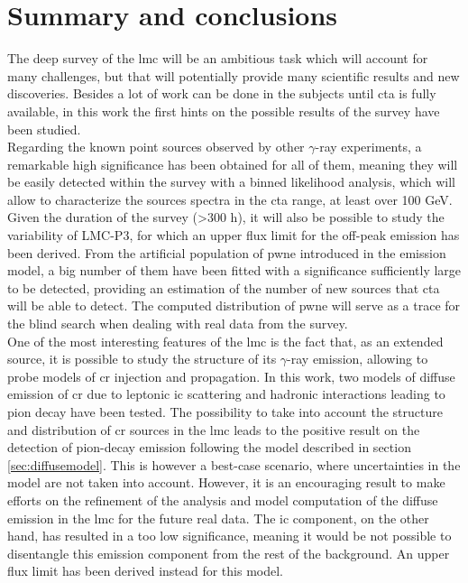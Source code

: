\documentclass[main.tex]{subfiles}
\begin{document}
\section{Summary and conclusions}

The deep survey of the \gls{lmc} will be an ambitious task which will account for many challenges, but that will potentially provide many scientific results and new discoveries. Besides a lot of work can be done in the subjects until \gls{cta} is fully available, in this work the first hints on the possible results of the survey have been studied.\\
Regarding the known point sources observed by other $\gamma$-ray experiments, a remarkable high significance has been obtained for all of them, meaning they will be easily detected within the survey with a binned likelihood analysis, which will allow to characterize the sources spectra in the \gls{cta} range, at least over 100 GeV. Given the duration of the survey (>300 h), it will also be possible to study the variability of LMC-P3, for which an upper flux limit for the off-peak emission has been derived. From the artificial population of \gls{pwne} introduced in the emission model, a big number of them have been fitted with a significance sufficiently large to be detected, providing an estimation of the number of new sources that \gls{cta} will be able to detect. The computed distribution of \gls{pwne} will serve as a trace for the blind search when dealing with real data from the survey.\\
One of the most interesting features of the \gls{lmc} is the fact that, as an extended source, it is possible to study the structure of its $\gamma$-ray emission, allowing to probe models of \gls{cr} injection and propagation. In this work, two models of diffuse emission of \gls{cr} due to leptonic \gls{ic} scattering and hadronic interactions leading to pion decay have been tested. The possibility to take into account the structure and distribution of \gls{cr} sources in the \gls{lmc} leads to the positive result on the detection of pion-decay emission following the model described in section \ref{sec:diffusemodel}. This is however a best-case scenario, where uncertainties in the model are not taken into account. However, it is an encouraging result to make efforts on the refinement of the analysis and model computation of the diffuse emission in the \gls{lmc} for the future real data. The \gls{ic} component, on the other hand, has resulted in a too low significance, meaning it would be not possible to disentangle this emission component from the rest of the background. An upper flux limit has been derived instead for this model.\\
\end{document}
